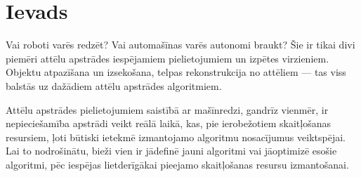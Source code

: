 \section*{Ievads} 
Vai roboti varēs redzēt? Vai automašīnas varēs autonomi braukt?
Šie ir tikai divi piemēri attēlu apstrādes iespējamiem pielietojumiem un
izpētes virzieniem. Objektu atpazīšana un izsekošana,
telpas rekonstrukcija no attēliem --- tas viss balstās uz dažādiem 
attēlu apstrādes algoritmiem.

Attēlu apstrādes pielietojumiem saistībā ar mašīnredzi, gandrīz vienmēr, ir
nepieciešamība apstrādi veikt reālā laikā, 
kas, pie ierobežotiem skaitļošanas resursiem, ļoti būtiski ietekmē 
izmantojamo algoritmu nosacījumus veiktspējai. Lai to nodrošinātu,
bieži vien ir jādefinē jauni algoritmi vai jāoptimizē esošie algoritmi,
pēc iespējas lietderīgākai pieejamo skaitļošanas resursu izmantošanai.

\TODO
